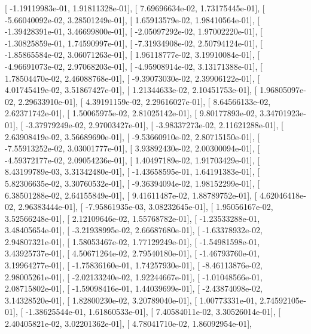 \documentclass{article}
\begin{document}
       [ -1.19119983e-01,   1.91811328e-01],
       [  7.69696634e-02,   1.73175445e-01],
       [ -5.66040092e-02,   3.28501249e-01],
       [  1.65913579e-02,   1.98410564e-01],
       [ -1.39428391e-01,   3.46699800e-01],
       [ -2.05097292e-02,   1.97002220e-01],
       [ -1.30825859e-01,   1.74590997e-01],
       [ -7.31934908e-02,   2.50794124e-01],
       [ -1.85865584e-02,   3.06071263e-01],
       [  1.96118777e-02,   3.19910084e-01],
       [ -4.96691073e-02,   2.97068203e-01],
       [ -4.95908914e-02,   3.13171388e-01],
       [  1.78504470e-02,   2.46088768e-01],
       [ -9.39073030e-02,   2.39906122e-01],
       [  4.01745419e-02,   3.51867427e-01],
       [  1.21344633e-02,   2.10451753e-01],
       [  1.96805097e-02,   2.29633910e-01],
       [  4.39191159e-02,   2.29616027e-01],
       [  8.64566133e-02,   2.62371742e-01],
       [  1.50065975e-02,   2.81025142e-01],
       [  9.80177893e-02,   3.34701923e-01],
       [ -3.37979249e-02,   2.97003427e-01],
       [ -3.98337273e-02,   2.11621288e-01],
       [  2.63908419e-02,   3.56689690e-01],
       [ -9.53660910e-02,   2.80715150e-01],
       [ -7.55913252e-02,   3.03001777e-01],
       [  3.93892430e-02,   2.00300094e-01],
       [ -4.59372177e-02,   2.09054236e-01],
       [  1.40497189e-02,   1.91703429e-01],
       [  8.43199789e-03,   3.31342480e-01],
       [ -1.43658595e-01,   1.64191383e-01],
       [  5.82306635e-02,   3.30760532e-01],
       [ -9.36394094e-02,   1.98152299e-01],
       [  6.38501288e-02,   2.64155849e-01],
       [  9.41611487e-02,   1.88789752e-01],
       [  4.62046418e-02,   2.96383444e-01],
       [ -7.95861935e-03,   3.08232645e-01],
       [  1.95056167e-02,   3.52566248e-01],
       [  2.12109646e-02,   1.55768782e-01],
       [ -1.23533288e-01,   3.48405654e-01],
       [ -3.21938995e-02,   2.66687680e-01],
       [ -1.63378932e-02,   2.94807321e-01],
       [  1.58053467e-02,   1.77129249e-01],
       [ -1.54981598e-01,   3.43925737e-01],
       [  4.50671264e-02,   2.79540180e-01],
       [ -1.46793760e-01,   3.19964277e-01],
       [ -1.75836160e-01,   1.74257930e-01],
       [ -8.46113876e-02,   2.98005261e-01],
       [ -2.02133240e-02,   1.92244667e-01],
       [ -1.01048566e-01,   2.08715802e-01],
       [ -1.59098416e-01,   1.44039699e-01],
       [ -2.43874098e-02,   3.14328520e-01],
       [  1.82800230e-02,   3.20789040e-01],
       [  1.00773331e-01,   2.74592105e-01],
       [ -1.38625544e-01,   1.61860533e-01],
       [  7.40584011e-02,   3.30526014e-01],
       [  2.40405821e-02,   3.02201362e-01],
       [  4.78041710e-02,   1.86092954e-01],
\end{document}
